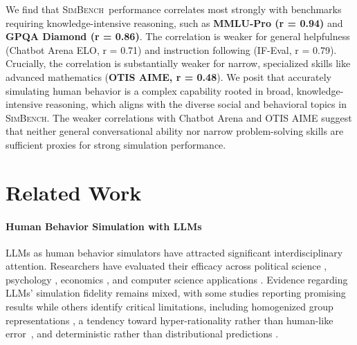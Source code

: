 \documentclass{article} %
\begin{document}
We find that \textsc{SimBench}\ performance correlates most strongly with benchmarks requiring knowledge-intensive reasoning, such as \textbf{MMLU-Pro (r = 0.94)} and \textbf{GPQA Diamond (r = 0.86)}. The correlation is weaker for general helpfulness (Chatbot Arena ELO, r = 0.71) and instruction following (IF-Eval, r = 0.79). Crucially, the correlation is substantially weaker for narrow, specialized skills like advanced mathematics (\textbf{OTIS AIME, r = 0.48}). We posit that accurately simulating human behavior is a complex capability rooted in broad, knowledge-intensive reasoning, which aligns with the diverse social and behavioral topics in \textsc{SimBench}. The weaker correlations with Chatbot Arena and OTIS AIME suggest that neither general conversational ability nor narrow problem-solving skills are sufficient proxies for strong simulation performance.



















\section{Related Work}
\label{sec: related work}

\paragraph{Human Behavior Simulation with LLMs}
LLMs as human behavior simulators have attracted significant interdisciplinary attention. Researchers have evaluated their efficacy across political science \citep{Argyle_Busby_Fulda_Gubler_Rytting_Wingate_2023, Bisbee_Clinton_Dorff_Kenkel_Larson_2024, NEURIPS2024_Dominguez}, psychology \citep{Aher2023Using, manning2024automated, hewitt2024predicting, binz2024centaur}, economics \citep{horton2023large, Aher2023Using}, and computer science applications \citep{10.1145/3586183.3606763, hu-collier-2024-quantifying, dong-etal-2024-llm, hu2025inews}. Evidence regarding LLMs' simulation fidelity remains mixed, with some studies reporting promising results \citep{Argyle_Busby_Fulda_Gubler_Rytting_Wingate_2023} while others identify critical limitations, including homogenized group representations \citep{cheng-etal-2023-compost, wang2025large}, a tendency toward hyper-rationality rather than human-like error~\citep{liu2025large}, and deterministic rather than distributional predictions \citep{park2024diminished}.
\end{document}
